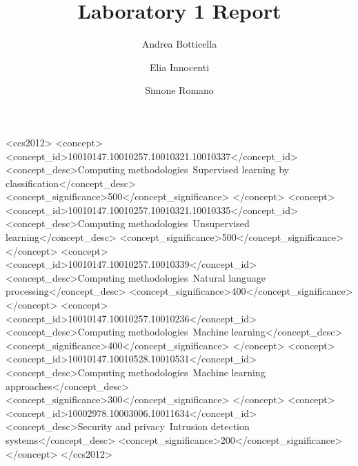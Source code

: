 \documentclass[acmlarge]{template/column-format-template/acmart}
\begin{document}
\title{Laboratory 1 Report}


\author{Andrea Botticella}

\author{Elia Innocenti}
\authornotemark[1]

\author{Simone Romano}
\authornotemark[1]

\renewcommand{\shortauthors}{Botticella, Innocenti, and Romano}

\begin{CCSXML}
<ccs2012>
   <concept>
       <concept_id>10010147.10010257.10010321.10010337</concept_id>
       <concept_desc>Computing methodologies~Supervised learning by classification</concept_desc>
       <concept_significance>500</concept_significance>
   </concept>
   <concept>
       <concept_id>10010147.10010257.10010321.10010335</concept_id>
       <concept_desc>Computing methodologies~Unsupervised learning</concept_desc>
       <concept_significance>500</concept_significance>
   </concept>
   <concept>
       <concept_id>10010147.10010257.10010339</concept_id>
       <concept_desc>Computing methodologies~Natural language processing</concept_desc>
       <concept_significance>400</concept_significance>
   </concept>
   <concept>
       <concept_id>10010147.10010257.10010236</concept_id>
       <concept_desc>Computing methodologies~Machine learning</concept_desc>
       <concept_significance>400</concept_significance>
   </concept>
   <concept>
       <concept_id>10010147.10010528.10010531</concept_id>
       <concept_desc>Computing methodologies~Machine learning approaches</concept_desc>
       <concept_significance>300</concept_significance>
   </concept>
   <concept>
       <concept_id>10002978.10003006.10011634</concept_id>
       <concept_desc>Security and privacy~Intrusion detection systems</concept_desc>
       <concept_significance>200</concept_significance>
   </concept>
</ccs2012>
\end{CCSXML}
\end{document}
